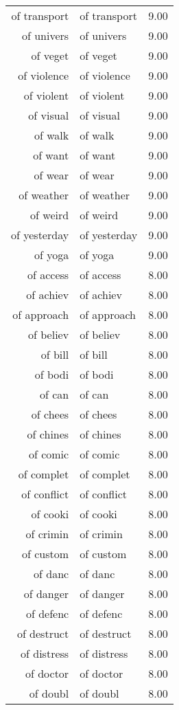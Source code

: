 \begin{table}[ht]
\begin{tabular}{rlr}
  of transport & of transport & 9.00 \\ 
  of univers & of univers & 9.00 \\ 
  of veget & of veget & 9.00 \\ 
  of violence & of violence & 9.00 \\ 
  of violent & of violent & 9.00 \\ 
  of visual & of visual & 9.00 \\ 
  of walk & of walk & 9.00 \\ 
  of want & of want & 9.00 \\ 
  of wear & of wear & 9.00 \\ 
  of weather & of weather & 9.00 \\ 
  of weird & of weird & 9.00 \\ 
  of yesterday & of yesterday & 9.00 \\ 
  of yoga & of yoga & 9.00 \\ 
  of access & of access & 8.00 \\ 
  of achiev & of achiev & 8.00 \\ 
  of approach & of approach & 8.00 \\ 
  of believ & of believ & 8.00 \\ 
  of bill & of bill & 8.00 \\ 
  of bodi & of bodi & 8.00 \\ 
  of can & of can & 8.00 \\ 
  of chees & of chees & 8.00 \\ 
  of chines & of chines & 8.00 \\ 
  of comic & of comic & 8.00 \\ 
  of complet & of complet & 8.00 \\ 
  of conflict & of conflict & 8.00 \\ 
  of cooki & of cooki & 8.00 \\ 
  of crimin & of crimin & 8.00 \\ 
  of custom & of custom & 8.00 \\ 
  of danc & of danc & 8.00 \\ 
  of danger & of danger & 8.00 \\ 
  of defenc & of defenc & 8.00 \\ 
  of destruct & of destruct & 8.00 \\ 
  of distress & of distress & 8.00 \\ 
  of doctor & of doctor & 8.00 \\ 
  of doubl & of doubl & 8.00 \\ 

\end{tabular}
\end{table}
